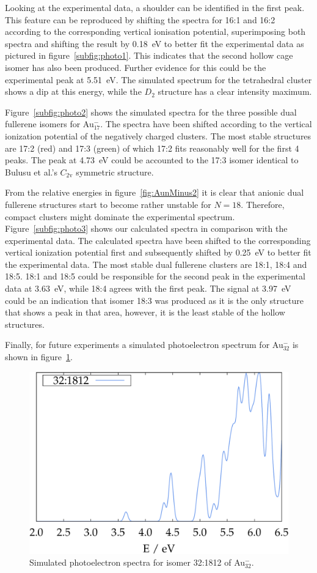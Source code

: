 %
Looking at the experimental data, a shoulder can be identified in the first
peak. This feature can be reproduced by shifting the spectra for 16:1 and 16:2
according to the corresponding vertical ionisation potential, superimposing both
spectra and shifting the result by 0.18~eV to better fit the experimental data
as pictured in figure~\ref{subfig:photo1}. This indicates that the second hollow
cage isomer has also been produced. Further evidence for this could be the
experimental peak at 5.51~eV. The simulated spectrum for the tetrahedral cluster
shows a dip at this energy, while the $D_\mathrm{2}$ structure has a clear
intensity maximum. 

Figure~\ref{subfig:photo2} shows the simulated spectra for the three possible
dual fullerene isomers for Au$_{17}^-$. The spectra have been shifted according
to the vertical ionization potential of the negatively charged clusters. The
most stable structures are 17:2 (red) and 17:3 (green) of which 17:2 fits
reasonably well for the first 4 peaks. The peak at 4.73~eV could be accounted
to the 17:3 isomer identical to Bulusu et al.'s $C_\mathrm{2v}$
symmetric structure.

From the relative energies in figure~\ref{fig:AunMinus2} it is clear that
anionic dual fullerene structures start to become rather unstable for $N=18$.
Therefore, compact clusters might dominate the experimental spectrum.
Figure~\ref{subfig:photo3} shows our calculated spectra in comparison with the
experimental data. The calculated spectra have been shifted to the corresponding
vertical ionization potential first and subsequently shifted by 0.25~eV to
better fit the experimental data. The most stable dual fullerene clusters are
18:1, 18:4 and 18:5. 18:1 and 18:5 could be responsible for the second peak in
the experimental data at 3.63~eV, while 18:4 agrees with the first peak. The
signal at 3.97~eV could be an indication that isomer 18:3 was produced as it is
the only structure that shows a peak in that area, however, it is the least
stable of the hollow structures.

Finally, for future experiments a simulated photoelectron spectrum for
Au$_{32}^-$ is shown in figure~\ref{fig:photo_Au32}.
%
\begin{figure}[htb]
\begin{center}
\includegraphics[width=.75\textwidth]{golddual/photo/Au32/nonrel/compare.pdf}
\caption{Simulated photoelectron spectra for isomer 32:1812 of Au$_{32}^-$.}
  \label{fig:photo_Au32}
\end{center}
\end{figure}

